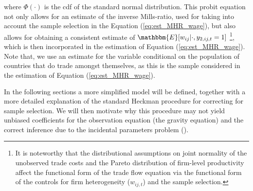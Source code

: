 \noindent where $\Phi(\cdot)$ is the cdf of the standard normal distribution. This probit equation not only allows for an estimate of the inverse Mills-ratio, used for taking into account the sample selection in the Equation (\ref{eq:est_MHR_wage}), but also allows for obtaining a consistent estimate of $\mathbbm{E} [ w_{ij} \rvert \cdot, y_{2,ij,t} = 1]$ \footnote{It is noteworthy that the distributional assumptions on joint normality of the unobserved trade costs and the Pareto distribution of firm-level productivity affect the functional form of the trade flow equation via the functional form of the controls for firm heterogeneity ($w_{ij,t}$) and the sample selection.}, which is then incorporated in the estimation of Equation (\ref{eq:est_MHR_wage}). Note that, we use an estimate for the variable conditional on the population of countries that do trade amongst themselves, as this is the sample considered in the estimation of Equation (\ref{eq:est_MHR_wage}).

In the following sections a more simplified model will be defined, together with a more detailed explanation of the standard Heckman procedure for correcting for sample selection. We will then motivate why this procedure may not yield unbiased coefficients for the observation equation (the gravity equation) and the correct inference due to the incidental parameters problem (\cite{neyman1948consistent}). 
